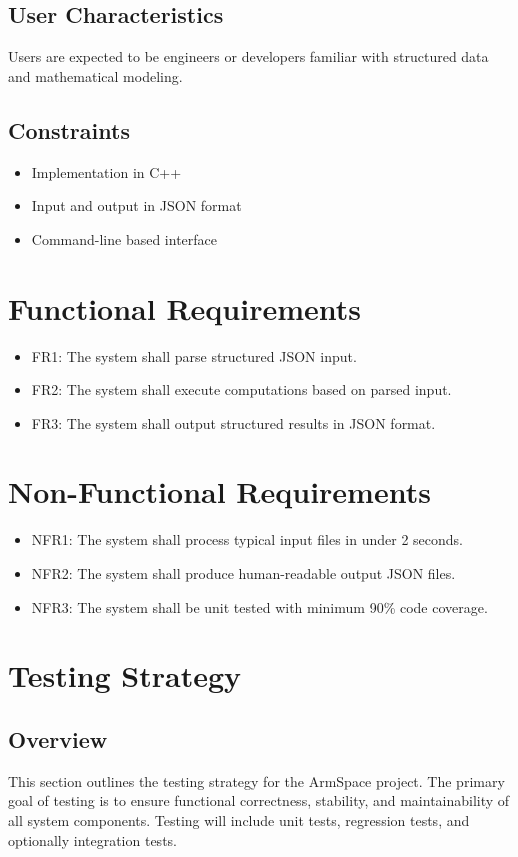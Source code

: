 \documentclass[a4paper,11pt]{article}
\begin{document}
	\subsection{User Characteristics}
	Users are expected to be engineers or developers familiar with structured data and mathematical modeling.
	
	\subsection{Constraints}
	\begin{itemize}
		\item Implementation in C++
		\item Input and output in JSON format
		\item Command-line based interface
	\end{itemize}
	
	\section{Functional Requirements}
	\begin{itemize}
		\item FR1: The system shall parse structured JSON input.
		\item FR2: The system shall execute computations based on parsed input.
		\item FR3: The system shall output structured results in JSON format.
	\end{itemize}
	
	\section{Non-Functional Requirements}
	\begin{itemize}
		\item NFR1: The system shall process typical input files in under 2 seconds.
		\item NFR2: The system shall produce human-readable output JSON files.
		\item NFR3: The system shall be unit tested with minimum 90\% code coverage.
	\end{itemize}
	
	\section{Testing Strategy}
	\subsection{Overview}
	This section outlines the testing strategy for the ArmSpace project. The primary goal of testing is to ensure functional correctness, stability, and maintainability of all system components. Testing will include unit tests, regression tests, and optionally integration tests.
	
\end{document}
